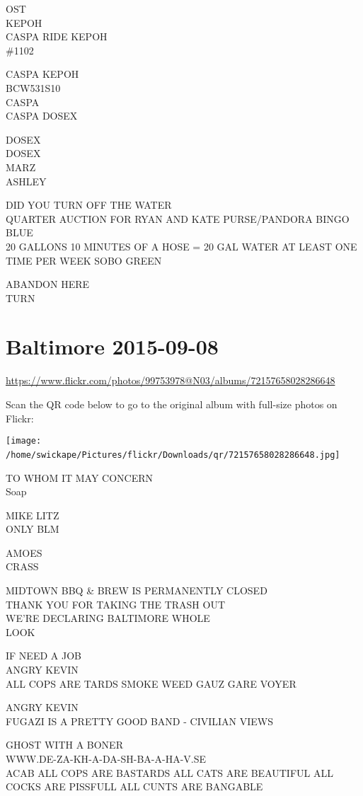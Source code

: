 \documentclass[10pt,letterpaper]{article}
\begin{document}
OST\\
KEPOH\\
CASPA RIDE KEPOH\\
\#1102

CASPA KEPOH\\
BCW531S10\\
CASPA\\
CASPA DOSEX

DOSEX\\
DOSEX\\
MARZ\\
ASHLEY

DID YOU TURN OFF THE WATER\\
QUARTER AUCTION FOR RYAN AND KATE PURSE/PANDORA BINGO\\
BLUE\\
20 GALLONS 10 MINUTES OF A HOSE = 20 GAL WATER AT LEAST ONE TIME PER WEEK SOBO GREEN

ABANDON HERE\\
TURN
\

\section*{Baltimore 2015-09-08}

\url{https://www.flickr.com/photos/99753978@N03/albums/72157658028286648}

Scan the QR code below to go to the original album with full-size photos on Flickr:

\texttt{[image: /home/swickape/Pictures/flickr/Downloads/qr/72157658028286648.jpg]}
\

TO WHOM IT MAY CONCERN\\
Soap

MIKE LITZ\\
ONLY BLM

AMOES\\
CRASS

MIDTOWN BBQ \& BREW IS PERMANENTLY CLOSED\\
THANK YOU FOR TAKING THE TRASH OUT\\
WE'RE DECLARING BALTIMORE WHOLE\\
LOOK

IF NEED A JOB\\
ANGRY KEVIN\\
ALL COPS ARE TARDS SMOKE WEED GAUZ GARE VOYER

ANGRY KEVIN\\
FUGAZI IS A PRETTY GOOD BAND {-} CIVILIAN VIEWS

GHOST WITH A BONER\\
WWW.DE{-}ZA{-}KH{-}A{-}DA{-}SH{-}BA{-}A{-}HA{-}V.SE\\
ACAB ALL COPS ARE BASTARDS ALL CATS ARE BEAUTIFUL ALL COCKS ARE PISSFULL ALL CUNTS ARE BANGABLE
\end{document}
